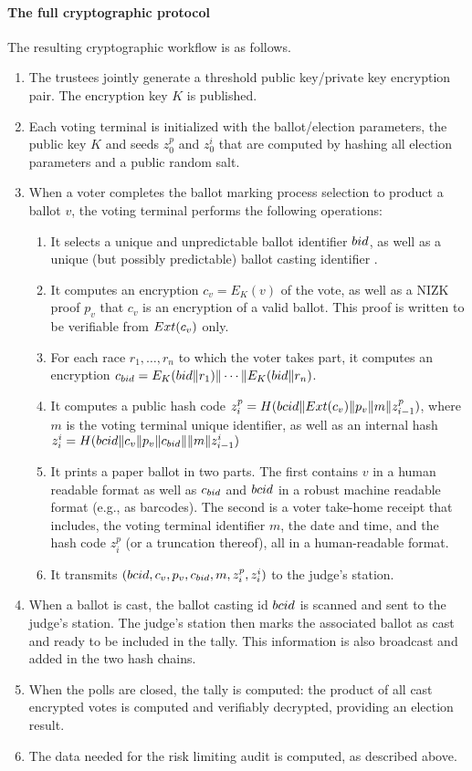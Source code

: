 \paragraph{The full cryptographic protocol}
\label{sec:full-protocol}
The resulting cryptographic workflow is as follows. 
\begin{enumerate}
\item The trustees jointly generate a threshold public key/private key
  encryption pair. The encryption key $K$ is published.
\item Each voting terminal is initialized with the ballot/election
  parameters, the public key $K$ and seeds $z_0^p$ and $z_0^i$ that
  are computed by hashing all election parameters and a public random
  salt.
\item When a voter completes the ballot marking process selection
  to product a ballot $v$, the voting terminal performs the following operations: 
  \begin{enumerate}
  \item It selects a unique and unpredictable ballot identifier
    ${bid}$, as well as a unique (but possibly predictable) ballot
    casting identifier \bcid.
  \item It computes an encryption $c_v = E_K(v)$ of the vote, as well
    as a NIZK proof $p_v$ that $c_v$ is an encryption of a valid
    ballot. This proof is written to be verifiable from $Ext(c_v)$
    only.
  \item For each race $r_1, \dots, r_n$ to which the voter takes part, it computes
    an encryption $c_{bid} = E_K({bid} \| r_1) \| \cdots \| E_K({bid} \| r_n)$. 
  \item It computes a public hash code $z^p_i = H({bcid} \| Ext(c_v) \| p_v \|
    m \| z^p_{i-1})$, where $m$ is the voting terminal unique
    identifier, as well as an internal hash $z^i_i = H({bcid} \| c_v \| p_v \|
    c_{bid} \| \| m \| z_{i-1}^i)$
  \item It prints a paper ballot in two parts. The first contains $v$
    in a human readable format as well as $c_{bid}$ and ${bcid}$ in a
    robust machine readable format (e.g., as barcodes). The second is
    a voter take-home receipt that includes, the voting terminal
    identifier $m$, the date and time, and the hash code $z^p_i$ (or a
    truncation thereof), all in a human-readable format.
  \item It transmits $({bcid}, c_v, p_v, c_{bid}, m, z^p_i, z^i_i)$ to
    the judge's station.
  \end{enumerate}
\item When a ballot is cast, the ballot casting id ${bcid}$ is scanned
  and sent to the judge's station.  The judge's station then marks the
  associated ballot as cast and ready to be included in the
  tally. This information is also broadcast and added in the two hash
  chains.
\item When the polls are closed, the tally is computed: the product of
  all cast encrypted votes is computed and verifiably decrypted,
  providing an election result.
\item The data needed for the risk limiting audit is computed, as described above. 
\end{enumerate}

